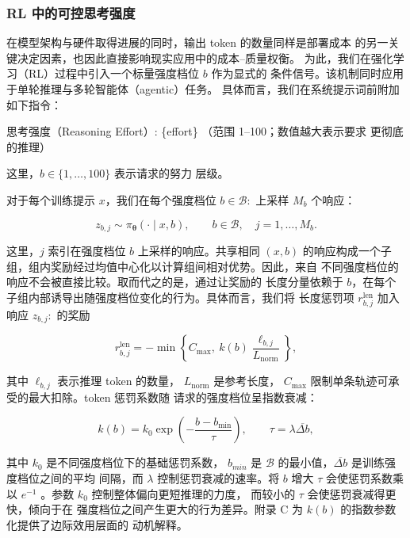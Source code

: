 \documentclass[
  10
]{article}
\begin{document}
\subsubsection{RL 中的可控思考强度}\label{controllable-reasoning-effort-in-rl}

在模型架构与硬件取得进展的同时，输出 token 的数量同样是部署成本
的另一关键决定因素，也因此直接影响现实应用中的成本--质量权衡。
为此，我们在强化学习（RL）过程中引入一个标量强度档位 $b$ 作为显式的
条件信号。该机制同时应用于单轮推理与多轮智能体（agentic）任务。
具体而言，我们在系统提示词前附加如下指令：

思考强度（Reasoning Effort）: \{effort\} （范围 1--100；数值越大表示要求
更彻底的推理）

这里，\(b \in \{ 1 , \dots , 1 0 0 \}\) 表示请求的努力
层级。

对于每个训练提示 $x$，我们在每个强度档位 \(b \in { \mathcal { B } } :\) 上采样 \(M _ { b }\) 个响应：

\[
z _ { b , j } \sim \pi _ { \boldsymbol { \theta } } ( \cdot \mid x , b ) , \qquad b \in \mathcal { B } , \quad j = 1 , \ldots , M _ { b } .\tag{8}
\]

这里，$j$ 索引在强度档位 $b$ 上采样的响应。共享相同 \(( x , b )\) 的响应构成一个子组，组内奖励经过均值中心化以计算组间相对优势。因此，来自
不同强度档位的响应不会被直接比较。取而代之的是，通过让奖励的
长度分量依赖于 $b$，在每个子组内部诱导出随强度档位变化的行为。具体而言，我们将
长度惩罚项 \(r _ { b , j } ^ { \mathrm { l e n } }\) 加入
响应 \(z _ { b , j } \mathrm { : }\) 的奖励

\[
r _ { b , j } ^ { \mathrm { l e n } } = - \operatorname* { m i n } \left\{ C _ { \mathrm { m a x } } , \ k ( b ) \frac { \ell _ { b , j } } { L _ { \mathrm { n o r m } } } \right\} ,\tag{9}
\]

其中 \(\ell _ { b , j }\) 表示推理 token 的数量，
\(L _ { \mathrm { n o r m } }\) 是参考长度，
\(C _ { \mathrm { m a x } }\) 限制单条轨迹可承受的最大扣除。token 惩罚系数随
请求的强度档位呈指数衰减：

\[
k ( b ) = k _ { 0 } \exp \left( - \frac { b - b _ { \mathrm { m i n } } } { \tau } \right) , \qquad \tau = \lambda \overline { { \Delta b } } ,\tag{10}
\]

其中 \(k _ { 0 }\) 是不同强度档位下的基础惩罚系数，
\(b _ { m i n }\) 是 $\mathcal{B}$ 的最小值，$\overline { { \Delta b } }$ 是训练强度档位之间的平均
间隔，而 $\lambda$ 控制惩罚衰减的速率。将 $b$ 增大 $\tau$ 会使惩罚系数乘以
\(e ^ { - 1 }\) 。参数 \(k _ { 0 }\) 控制整体偏向更短推理的力度，
而较小的 $\tau$ 会使惩罚衰减得更快，倾向于在
强度档位之间产生更大的行为差异。附录 C 为 $k(b)$ 的指数参数化提供了边际效用层面的
动机解释。
\end{document}
